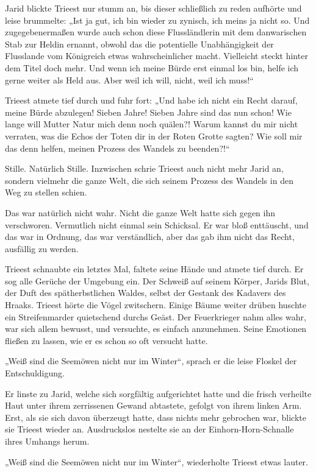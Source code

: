 Jarid blickte Trieest nur stumm an, bis dieser schließlich zu reden aufhörte und leise brummelte: „Ist ja gut, ich bin wieder zu zynisch, ich meins ja nicht so. Und zugegebenermaßen wurde auch schon diese Flussländlerin mit dem danwarischen Stab zur Heldin ernannt, obwohl das die potentielle Unabhängigkeit der Flusslande vom Königreich etwas wahrscheinlicher macht. Vielleicht steckt hinter dem Titel doch mehr. Und wenn ich meine Bürde erst einmal los bin, helfe ich gerne weiter als Held aus. Aber weil ich will, nicht, weil ich muss!“

Trieest atmete tief durch und fuhr fort: „Und habe ich nicht ein Recht darauf, meine Bürde abzulegen! Sieben Jahre! Sieben Jahre sind das nun schon! Wie lange will Mutter Natur mich denn noch quälen?! Warum kannst du mir nicht verraten, was die Echos der Toten dir in der Roten Grotte sagten? Wie soll mir das denn helfen, meinen Prozess des Wandels zu beenden?!“

Stille. Natürlich Stille. Inzwischen schrie Trieest auch nicht mehr Jarid an, sondern vielmehr die ganze Welt, die sich seinem Prozess des Wandels in den Weg zu stellen schien.

Das war natürlich nicht wahr. Nicht die ganze Welt hatte sich gegen ihn verschworen. Vermutlich nicht einmal sein Schicksal. Er war bloß enttäuscht, und das war in Ordnung, das war verständlich, aber das gab ihm nicht das Recht, ausfällig zu werden.

Trieest schnaubte ein letztes Mal, faltete seine Hände und atmete tief durch. Er sog alle Gerüche der Umgebung ein. Der Schweiß auf seinem Körper, Jarids Blut, der Duft des spätherbstlichen Waldes, selbst der Gestank des Kadavers des Hraaks. Trieest hörte die Vögel zwitschern. Einige Bäume weiter drüben huschte ein Streifenmarder quietschend durchs Geäst. Der Feuerkrieger nahm alles wahr, war sich allem bewusst, und versuchte, es einfach anzunehmen. Seine Emotionen fließen zu lassen, wie er es schon so oft versucht hatte.

„Weiß sind die Seemöwen nicht nur im Winter“, sprach er die leise Floskel der Entschuldigung.

Er linste zu Jarid, welche sich sorgfältig aufgerichtet hatte und die frisch verheilte Haut unter ihrem zerrissenen Gewand abtastete, gefolgt von ihrem linken Arm. Erst, als sie sich davon überzeugt hatte, dass nichts mehr gebrochen war, blickte sie Trieest wieder an. Ausdruckslos nestelte sie an der Einhorn-Horn-Schnalle ihres Umhangs herum.

„Weiß sind die Seemöwen nicht nur im Winter“, wiederholte Trieest etwas lauter.

